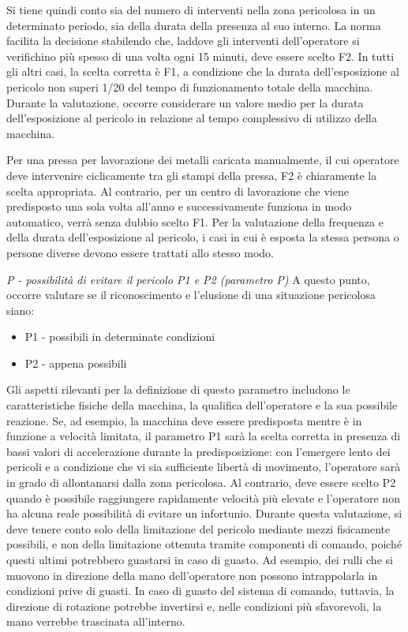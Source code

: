 Si tiene quindi conto sia del numero di interventi nella zona pericolosa in un determinato periodo, sia della durata della presenza al suo interno. La norma facilita la decisione stabilendo che, laddove gli interventi dell'operatore si verifichino più spesso di una volta ogni 15 minuti, deve essere scelto F2. In tutti gli altri casi, la scelta corretta è F1, a condizione che la durata dell'esposizione al pericolo non superi 1/20 del tempo di funzionamento totale della macchina. Durante la valutazione, occorre considerare un valore medio per la durata dell'esposizione al pericolo in relazione al tempo complessivo di utilizzo della macchina.

Per una pressa per lavorazione dei metalli caricata manualmente, il cui operatore deve intervenire ciclicamente tra gli stampi della pressa, F2 è chiaramente la scelta appropriata. Al contrario, per un centro di lavorazione che viene predisposto una sola volta all'anno e successivamente funziona in modo automatico, verrà senza dubbio scelto F1. Per la valutazione della frequenza e della durata dell'esposizione al pericolo, i casi in cui è esposta la stessa persona o persone diverse devono essere trattati allo stesso modo.

\textit{P - possibilità di evitare il pericolo P1 e P2 (parametro P)}
A questo punto, occorre valutare se il riconoscimento e l'elusione di una situazione pericolosa siano:

\begin{itemize}
    \item P1 - possibili in determinate condizioni
    \item P2 - appena possibili
\end{itemize}

Gli aspetti rilevanti per la definizione di questo parametro includono le caratteristiche fisiche della macchina, la qualifica dell'operatore e la sua possibile reazione. Se, ad esempio, la macchina deve essere predisposta mentre è in funzione a velocità limitata, il parametro P1 sarà la scelta corretta in presenza di bassi valori di accelerazione durante la predisposizione: con l'emergere lento dei pericoli e a condizione che vi sia sufficiente libertà di movimento, l'operatore sarà in grado di allontanarsi dalla zona pericolosa. Al contrario, deve essere scelto P2 quando è possibile raggiungere rapidamente velocità più elevate e l'operatore non ha alcuna reale possibilità di evitare un infortunio. Durante questa valutazione, si deve tenere conto solo della limitazione del pericolo mediante mezzi fisicamente possibili, e non della limitazione ottenuta tramite componenti di comando, poiché questi ultimi potrebbero guastarsi in caso di guasto. Ad esempio, dei rulli che si muovono in direzione della mano dell'operatore non possono intrappolarla in condizioni prive di guasti. In caso di guasto del sistema di comando, tuttavia, la direzione di rotazione potrebbe invertirsi e, nelle condizioni più sfavorevoli, la mano verrebbe trascinata all'interno.

